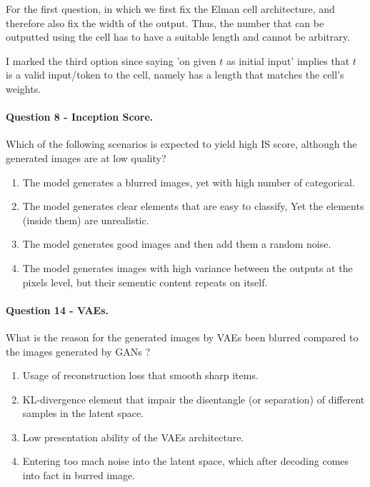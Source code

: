 \documentclass{article}
\begin{document}
For the first question, in which we first fix the Elman cell architecture, and therefore also fix the width of the output. Thus, the number that can be outputted using the cell has to have a suitable length and cannot be arbitrary.

I marked the third option since saying 'on given $t$ as initial input' implies that $t$ is a valid input/token to the cell, namely has a length that matches the cell's weights.


\paragraph{ Question 8 - Inception Score. } Which of the following scenarios is expected to yield high IS score, although the generated images are at low quality?
\begin{enumerate}
  \item The model generates a blurred images, yet with high number of categorical.  
  \item The model generates clear elements that are easy to classify, Yet the elements (inside them) are unrealistic. 
  \item The model generates good images and then add them a random noise. 
  \item The model generates images with high variance between the outputs at the pixels level, but their sementic content repeats on itself.    
\end{enumerate}
\paragraph{ Question 14 - VAEs. } What is the reason for the generated images by VAEs been blurred compared to the images generated by GANs ?   
\begin{enumerate}
  \item Usage of reconstruction loss that smooth sharp items.   
  \item  KL-divergence element that impair the disentangle (or separation) of different samples in the latent space. 
  \item Low presentation ability of the VAEs architecture. 
  \item Entering too mach noise into the latent space, which after decoding comes into fact in burred image. 

\end{enumerate}
\end{document}

